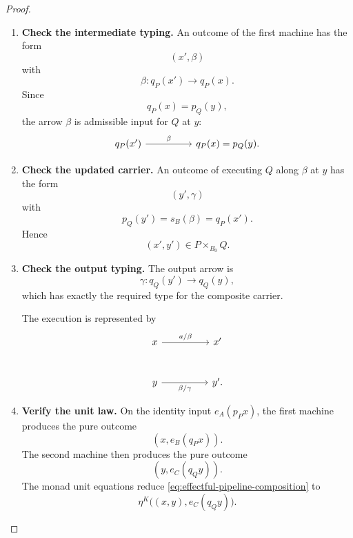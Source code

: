 \begin{proof}
    \leavevmode
    \begin{enumerate}
        \item \textbf{Check the intermediate typing.}
        An outcome of the first machine has the form
        \[
            (x',\beta)
        \]
        with
        \[
            \beta:
            q_P(x')\to q_P(x).
        \]
        Since
        \[
            q_P(x)=p_Q(y),
        \]
        the arrow \(\beta\) is admissible input for \(Q\) at \(y\):
        \[
            \begin{tikzcd}[column sep=huge]
                    q_P(x')
                        \arrow[r, "\beta"]
                &
                    q_P(x)=p_Q(y).
            \end{tikzcd}
        \]

        \item \textbf{Check the updated carrier.}
        An outcome of executing \(Q\) along \(\beta\) at \(y\) has the form
        \[
            (y',\gamma)
        \]
        with
        \[
            p_Q(y')
            =
            s_B(\beta)
            =
            q_P(x').
        \]
        Hence
        \[
            (x',y')
            \in
            P\times_{B_0}Q.
        \]

        \item \textbf{Check the output typing.}
        The output arrow is
        \[
            \gamma:
            q_Q(y')\to q_Q(y),
        \]
        which has exactly the required type for the composite carrier.

        The execution is represented by
        \[
            \begin{tikzcd}[column sep=huge, row sep=large]
                    x
                        \arrow[r, "{a/\beta}"]
                &
                    x'
                \\
                    y
                        \arrow[r, "{\beta/\gamma}"']
                &
                    y'.
            \end{tikzcd}
        \]

        \item \textbf{Verify the unit law.}
        On the identity input \(e_A(p_Px)\), the first machine produces the
        pure outcome
        \[
            (x,e_B(q_Px)).
        \]
        The second machine then produces the pure outcome
        \[
            (y,e_C(q_Qy)).
        \]
        The monad unit equations reduce
        \eqref{eq:effectful-pipeline-composition} to
        \[
            \eta^K
            \bigl(
                (x,y),
                e_C(q_Qy)
            \bigr).
        \]


\end{enumerate}
\end{proof}
